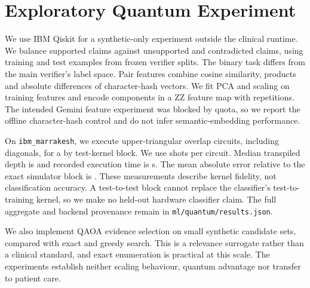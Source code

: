 \appendix
\section{Exploratory Quantum Experiment}
\label{app:quantum}
We use IBM Qiskit for a synthetic-only experiment outside the clinical runtime.
We balance supported claims against unsupported and contradicted claims, using
\QuantumTrain{} training and \QuantumTest{} test examples from frozen verifier
splits. The binary task differs from the main verifier's label space. Pair features
combine cosine similarity, products and absolute differences of character-hash
vectors. We fit PCA and scaling on training features and encode
\QuantumQubits{} components in a ZZ feature map with \QuantumReps{} repetitions.
The intended Gemini feature experiment was blocked by quota, so we report the
offline character-hash control and do not infer semantic-embedding performance.

On \texttt{ibm\_marrakesh}, we execute \QuantumCircuits{} upper-triangular overlap
circuits, including diagonals, for a \QuantumBlockSize{} by \QuantumBlockSize{}
test-kernel block. We use \QuantumShots{} shots per circuit. Median transpiled depth
is \QuantumDepth{} and recorded execution time is \QuantumSeconds{} s. The mean
absolute error relative to the exact simulator block is \QuantumMae{}. These
measurements describe kernel fidelity, not classification accuracy. A test-to-test
block cannot replace the classifier's test-to-training kernel, so we make no
held-out hardware classifier claim. The full aggregate and backend provenance remain
in \texttt{ml/quantum/results.json}.

We also implement QAOA evidence selection on small synthetic candidate sets, compared
with exact and greedy search. This is a relevance surrogate rather than a clinical
standard, and exact enumeration is practical at this scale. The experiments establish
neither scaling behaviour, quantum advantage nor transfer to patient care.
